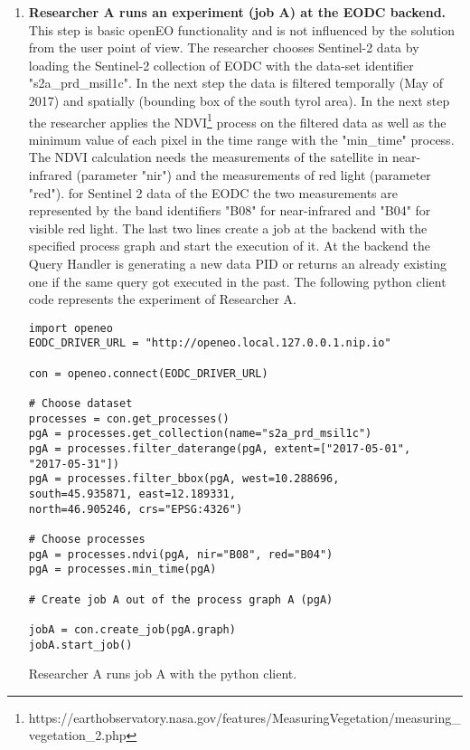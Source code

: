 \documentclass[draft,final]{vutinfth} %
\newenvironment{code}{\captionsetup{type=listing}}{}
\begin{document}
\begin{enumerate}
	\item \textbf{Researcher A runs an experiment (job A) at the EODC backend.} \\
	This step is basic openEO functionality and is not influenced by the solution from the user point of view. The researcher chooses Sentinel-2 data by loading the Sentinel-2 collection of EODC with the data-set identifier "s2a\_prd\_msil1c". In the next step the data is filtered temporally (May of 2017) and spatially (bounding box of the south tyrol area). In the next step the researcher applies the NDVI\footnote{https://earthobservatory.nasa.gov/features/MeasuringVegetation/measuring\_vegetation\_2.php} process on the filtered data as well as the minimum value of each pixel in the time range with the "min\_time" process. The NDVI calculation needs the measurements of the satellite in near-infrared (parameter "nir") and the measurements of red light (parameter "red"). for Sentinel 2 data of the EODC the two measurements are represented by the band identifiers "B08" for near-infrared and "B04" for visible red light. The last two lines create a job at the backend with the specified process graph and start the execution of it.
	At the backend the Query Handler is generating a new data PID or returns an already existing one if the same query got executed in the past. The following python client code represents the experiment of Researcher A.
	
\begin{code}
	\begin{verbatim}
import openeo
EODC_DRIVER_URL = "http://openeo.local.127.0.0.1.nip.io"

con = openeo.connect(EODC_DRIVER_URL)

# Choose dataset
processes = con.get_processes()
pgA = processes.get_collection(name="s2a_prd_msil1c")
pgA = processes.filter_daterange(pgA, extent=["2017-05-01", 
"2017-05-31"])
pgA = processes.filter_bbox(pgA, west=10.288696, 
south=45.935871, east=12.189331, 
north=46.905246, crs="EPSG:4326")

# Choose processes
pgA = processes.ndvi(pgA, nir="B08", red="B04")
pgA = processes.min_time(pgA)

# Create job A out of the process graph A (pgA)

jobA = con.create_job(pgA.graph)
jobA.start_job()
	\end{verbatim}
	\caption{Researcher A runs job A with the python client.}
	\label{lst:impl_usecase1_1}
\end{code}	


\end{enumerate}
\end{document}
